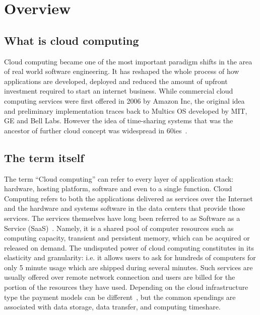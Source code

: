 \documentclass[licencjacka,en]{thesisclass}
\begin{document}

    \section{Overview}

        \subsection{What is cloud computing}

        Cloud computing became one of the most important paradigm shifts in the area of real world software engineering.
        It has reshaped the whole process of how applications are developed, deployed and reduced the amount of upfront
        investment required to start an internet business. While commercial cloud computing services were first offered
        in 2006 by Amazon Inc, the original idea and preliminary implementation traces back to Multics OS developed by MIT,
        GE and Bell Labs. However the idea of time-sharing systems that was the ancestor of further cloud
        concept was widespread in 60ies~\cite{BMarkus}.

        \subsection{The term itself}

        The term “Cloud computing” can refer to every layer of application stack:
        hardware, hosting platform, software and even to a single function.
        Cloud Computing refers to both the applications delivered as services over the Internet and
        the hardware and systems software in the data centers that provide those services.
        The services themselves have long been referred to as Software as a Service (SaaS)~\cite{MArmbrust}.
        Namely, it is a shared pool of computer resources such as computing capacity,
        transient and persistent memory, which can be acquired or released on demand.
        The undisputed power of cloud computing constitutes in its elasticity and granularity:
        i.e. it allows users to ask for hundreds of computers for only 5 minute usage which
        are shipped during several minutes.
        Such services are usually offered over remote network connection and users are billed
        for the portion of the resources they have used.
        Depending on the cloud infrastructure type the payment models can be different~\cite{GLaatikainen},
        but the common spendings are associated with data storage, data transfer, and computing timeshare.
\end{document}
